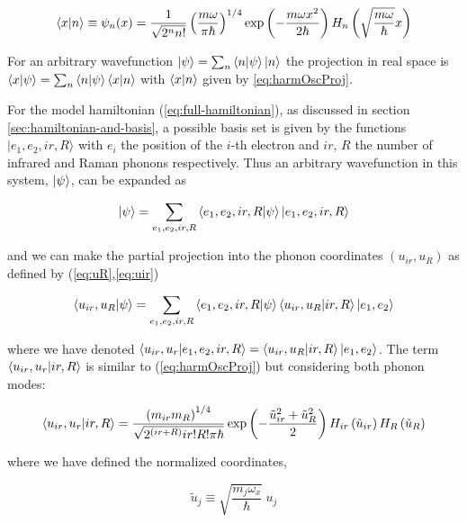 \begin{equation}
  \label{eq:harmOscProj}
  \left\langle x|n\right\rangle 
  \equiv \psi_n(x) 
  = \frac{1}{\sqrt{2^n n!}} \left(\frac{m \omega}{\pi \hbar}\right)^{1/4}
  \exp\left(-\frac{m \omega x^2}{2 \hbar}\right) H_n\left( \sqrt{\frac{m \omega}{\hbar}} x \right) 
\end{equation}


For an arbitrary wavefunction $\left | \psi \right\rangle = \sum_n \left\langle n|\psi\right\rangle \left | n \right\rangle$ the projection in real space is $\left\langle x|\psi\right\rangle = \sum_n \left\langle n|\psi\right\rangle \left\langle x|n\right\rangle$ with $\left\langle x|n\right\rangle$ given by \ref{eq:harmOscProj}.

For the model hamiltonian (\ref{eq:full-hamiltonian}), as discussed in section \ref{sec:hamiltonian-and-basis}, a possible basis set is given by the functions ${| e_1, e_2, ir, R \rangle}$ with $e_i$ the position of the $i$-th electron and $ir$, $R$ the number of infrared and Raman phonons respectively. 
Thus an arbitrary wavefunction in this system, $\left | \psi \right\rangle$, can be expanded as

\begin{equation}
  \label{eq:wf-phonon-base}
  \left | \psi \right\rangle=\sum_{e_1,e_2,ir,R} \left\langle e_1,e_2,ir,R|\psi\right\rangle\left | e_1,e_2,ir,R \right\rangle
\end{equation}

\noindent and we can make the partial projection into the phonon coordinates $(u_{ir},u_R)$ as defined by (\ref{eq:uR},\ref{eq:uir})

\begin{equation}
  \label{eq:wf-expansion}
  \left\langle u_{ir},u_R|\psi\right\rangle=\sum_{e_1,e_2,ir,R} \left\langle e_1,e_2,ir,R|\psi\right\rangle\left\langle u_{ir},u_R|ir,R\right\rangle\left | e_1,e_2 \right\rangle
\end{equation}

\noindent where we have denoted $\left\langle u_{ir},u_r|e_1,e_2,ir,R\right\rangle=\left\langle u_{ir},u_R|ir,R\right\rangle\left | e_1,e_2 \right\rangle$. 
The term $\left\langle u_{ir},u_r|ir,R\right\rangle$ is similar to (\ref{eq:harmOscProj}) but considering both phonon modes:

\begin{equation}
  \label{eq:hermite-expansion}
  \left\langle u_{ir},u_r|ir,R\right\rangle  = \frac{\left(m_{ir}m_R\right)^{1/4}}{\sqrt{2^{(ir+R)} ir!R!\pi\hbar}}
  \exp\left(-\frac{\tilde{u}_{ir}^2 + \tilde{u}_R^2}{2}\right) 
  H_{ir}\left(\tilde{u}_{ir} \right)H_{R}\left(\tilde{u}_{R} \right)
\end{equation}

\noindent where we have defined the normalized coordinates,

\begin{equation}
  \label{eq:uTildeDef}
  \tilde{u}_j \equiv \sqrt{\frac{m_j\omega_x}{\hbar}}\ u_j
\end{equation}

